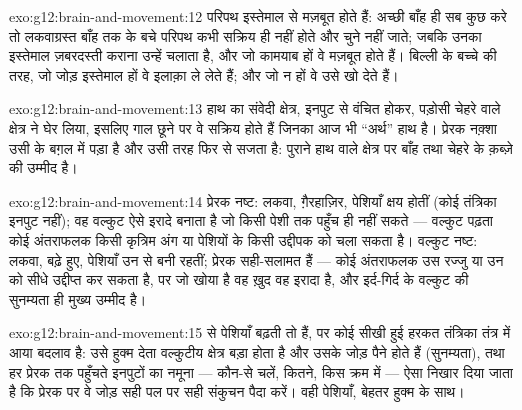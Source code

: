 \begin{solution}{exo:g12:brain-and-movement:12}
परिपथ इस्तेमाल से मज़बूत होते हैं: अच्छी बाँह ही सब कुछ करे तो लकवाग्रस्त
बाँह तक के बचे परिपथ कभी सक्रिय ही नहीं होते और चुने नहीं जाते; जबकि उनका
इस्तेमाल ज़बरदस्ती कराना उन्हें चलाता है, और जो कामयाब हों वे मज़बूत होते
हैं। बिल्ली के बच्चे की तरह, जो जोड़ इस्तेमाल हों वे इलाक़ा ले लेते हैं; और
जो न हों वे उसे खो देते हैं।
\end{solution}

\begin{solution}{exo:g12:brain-and-movement:13}
हाथ का संवेदी क्षेत्र, इनपुट से वंचित होकर, पड़ोसी चेहरे वाले क्षेत्र ने घेर
लिया, इसलिए गाल छूने पर वे  सक्रिय होते हैं जिनका आज भी ``अर्थ'' हाथ
है। प्रेरक नक़्शा उसी के बग़ल में पड़ा है और उसी तरह फिर से सजता है: पुराने
हाथ वाले क्षेत्र पर बाँह तथा चेहरे के क़ब्ज़े की उम्मीद है।
\end{solution}

\begin{solution}{exo:g12:brain-and-movement:14}
प्रेरक  नष्ट: लकवा,  ग़ैरहाज़िर, पेशियाँ क्षय होतीं (कोई
तंत्रिका इनपुट नहीं); वह वल्कुट ऐसे इरादे बनाता है जो किसी पेशी तक पहुँच ही
नहीं सकते --- वल्कुट पढ़ता कोई अंतराफलक किसी कृत्रिम अंग या पेशियों के किसी
उद्दीपक को चला सकता है। वल्कुट नष्ट: लकवा,  बढ़े हुए, पेशियाँ उन
 से बनी रहतीं; प्रेरक  सही-सलामत हैं --- कोई अंतराफलक उस
रज्जु या उन  को सीधे उद्दीप्त कर सकता है, पर जो खोया है वह ख़ुद वह
इरादा है, और इर्द-गिर्द के वल्कुट की सुनम्यता ही मुख्य उम्मीद है।
\end{solution}

\begin{solution}{exo:g12:brain-and-movement:15}
 से पेशियाँ बढ़ती तो हैं, पर कोई सीखी हुई हरकत तंत्रिका तंत्र में
आया बदलाव है: उसे हुक्म देता वल्कुटीय क्षेत्र बड़ा होता है और उसके जोड़ पैने
होते हैं (सुनम्यता), तथा हर प्रेरक  तक पहुँचते इनपुटों का नमूना ---
कौन-से चलें, कितने, किस क्रम में --- ऐसा निखार दिया जाता है कि प्रेरक
 पर वे जोड़ सही पल पर सही संकुचन पैदा करें। वही पेशियाँ, बेहतर हुक्म
के साथ।
\end{solution}

